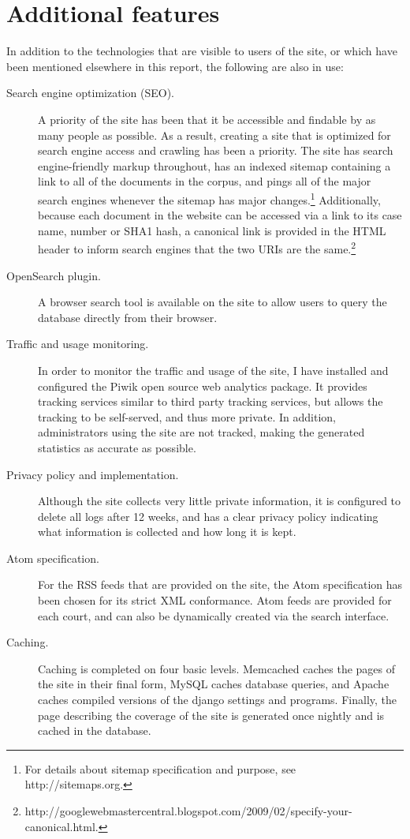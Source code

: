 \section{Additional features}
In addition to the technologies that are visible to users of the site, or which have been mentioned elsewhere in this report, the following are also in use:
\begin{description}
    \item[Search engine optimization (SEO).] A priority of the site has been that it be accessible and findable by as many people as possible. As a result, creating a site that is optimized for search engine access and crawling has been a priority. The site has search engine-friendly markup throughout, has an indexed sitemap containing a link to all of the documents in the corpus, and pings all of the major search engines whenever the sitemap has major changes.\footnote{For details about sitemap specification and purpose, see http://sitemaps.org.} Additionally, because each document in the website can be accessed via a link to its case name, number or SHA1 hash, a canonical link is provided in the HTML header to inform search engines that the two URIs are the same.\footnote{http://googlewebmastercentral.blogspot.com/2009/02/specify-your-canonical.html.}
    \item[OpenSearch plugin.] A browser search tool is available on the site to allow users to query the database directly from their browser.
    \item[Traffic and usage monitoring.] In order to monitor the traffic and usage of the site, I have installed and configured the Piwik open source web analytics package. It provides tracking services similar to third party tracking services, but allows the tracking to be self-served, and thus more private. In addition, administrators using the site are not tracked, making the generated statistics as accurate as possible.
    \item[Privacy policy and implementation.] Although the site collects very little private information, it is configured to delete all logs after 12 weeks, and has a clear privacy policy indicating what information is collected and how long it is kept.
    \item[Atom specification.] For the RSS feeds that are provided on the site, the Atom specification has been chosen for its strict XML conformance. Atom feeds are provided for each court, and can also be dynamically created via the search interface.
    \item[Caching.] Caching is completed on four basic levels. Memcached caches the pages of the site in their final form, MySQL caches database queries, and Apache caches compiled versions of the django settings and programs. Finally, the page describing the coverage of the site is generated once nightly and is cached in the database.

\end{description}
